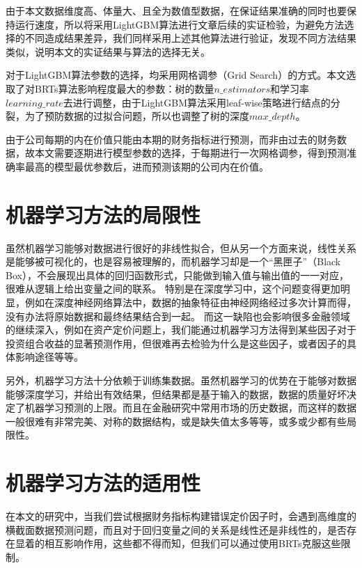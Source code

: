 由于本文数据维度高、体量大、且全为数值型数据，在保证结果准确的同时也要保持运行速度，所以将采用LightGBM算法进行文章后续的实证检验，为避免方法选择的不同造成结果差异，我们同样采用上述其他算法进行验证，发现不同方法结果类似，说明本文的实证结果与算法的选择无关。

对于LightGBM算法参数的选择，均采用网格调参（Grid Search）的方式。本文选取了对BRTs算法影响程度最大的参数：树的数量$n\_estimators$和学习率$learning\_rate$去进行调整，由于LightGBM算法采用leaf-wise策略进行结点的分裂，为了预防数据的过拟合问题，所以也调整了树的深度$max\_depth$。

由于公司每期的内在价值只能由本期的财务指标进行预测，而非由过去的财务数据，故本文需要逐期进行模型参数的选择，于每期进行一次网格调参，得到预测准确率最高的模型最优参数后，进而预测该期的公司内在价值。

\section{机器学习方法的局限性}
虽然机器学习能够对数据进行很好的非线性拟合，但从另一个方面来说，线性关系是能够被可视化的，也是容易被理解的，而机器学习却是一个“黑匣子”（Black Box），不会展现出具体的回归函数形式，只能做到输入值与输出值的一一对应，很难从逻辑上给出变量之间的联系\cite{zhaoJiQiXueXiZaiJinRongZiChanJieGeYuCeHePeiZhiZhongDeYingYongYanJiuShuPing2020}。
特别是在深度学习中，这个问题变得更加明显，例如在深度神经网络算法中，数据的抽象特征由神经网络经过多次计算而得，没有办法将原始数据和最终结果结合到一起。
而这一缺陷也会影响很多金融领域的继续深入，例如在资产定价问题上，我们能通过机器学习方法得到某些因子对于投资组合收益的显著预测作用，但很难再去检验为什么是这些因子，或者因子的具体影响途径等等。

另外，机器学习方法十分依赖于训练集数据\cite{luoJiYuWangLuoShuJuWaJueDeZiChanDingJieYanJiuShuPing2020}。虽然机器学习的优势在于能够对数据能够深度学习，并给出有效结果，但结果都是基于输入的数据，数据的质量好坏决定了机器学习预测的上限。而且在金融研究中常用市场的历史数据，而这样的数据一般很难有非常完美、对称的数据结构，或是缺失值太多等等，或多或少都有些局限性。

\section{机器学习方法的适用性}
在本文的研究中，当我们尝试根据财务指标构建错误定价因子时，会遇到高维度的横截面数据预测问题，而且对于回归变量之间的关系是线性还是非线性的，是否存在显着的相互影响作用，这些都不得而知，但我们可以通过使用BRTs克服这些限制。

